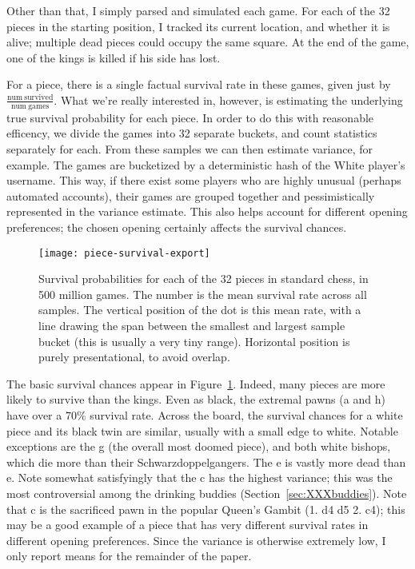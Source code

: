 \documentclass[twocolumn]{article}
\newcommand{\Pawn}[1][1.3ex]{%
\adjustbox{Trim=4.3pt 2.6pt 4.3pt 0pt,width=#1,margin=0.2ex 0ex 0.2ex 0ex}{\BlackPawnOnWhite}%
}%
\begin{document}
Other than that, I simply parsed and simulated each game. For each
of the 32 pieces in the starting position, I tracked its current
location, and whether it is alive; multiple dead pieces could
occupy the same square. At the end of the game, one of the kings is
killed if his side has lost.

For a piece, there is a single factual survival rate in these games,
given just by $\frac{\mathrm{num~survived}}{\mathrm{num~games}}$. What
we're really interested in, however, is estimating the underlying true
survival probability for each piece. In order to do this with
reasonable efficency, we divide the games into 32 separate buckets,
and count statistics separately for each. From these samples we can
then estimate variance, for example. The games are bucketized by a
deterministic hash of the White player's username. This way, if there
exist some players who are highly unusual (perhaps automated
accounts), their games are grouped together and pessimistically
represented in the variance estimate. This also helps account for
different opening preferences; the chosen opening certainly affects
the survival chances.

\begin{figure}[htb]
  \begin{center}
    \texttt{[image: piece-survival-export]}
  \end{center}\vspace{-0.1in}
  \caption{Survival probabilities for each of the 32 pieces in standard
    chess, in 500 million games. The number is the mean survival rate
    across all samples. The vertical position of the dot is this mean
    rate, with a line drawing the span between the smallest and largest
    sample bucket (this is usually a very tiny range).
    Horizontal position is purely presentational, to avoid overlap.}
  \label{fig:piece-survival}
\end{figure}

The basic survival chances appear in Figure~\ref{fig:piece-survival}.
Indeed, many pieces are more likely to survive than the kings. Even as
black, the extremal pawns (\pawn a and \pawn h) have over a 70\%
survival rate. Across the board, the survival chances for a white
piece and its black twin are similar, usually with a small edge to
white. Notable exceptions are the \knight g (the overall most doomed
piece), and both white bishops, which die more than their
Schwarzdoppelgangers. The \pawn e is vastly more dead than \Pawn e.
Note somewhat satisfyingly that the \pawn c has the highest variance;
this was the most controversial among the drinking buddies
(Section~\ref{sec:XXXbuddies}). Note that \pawn c is the sacrificed
pawn in the popular Queen's Gambit (1. d4 d5 2. c4); this may be a
good example of a piece that has very different survival rates in
different opening preferences. Since the variance is otherwise
extremely low, I only report means for the remainder of the paper.
\end{document}

